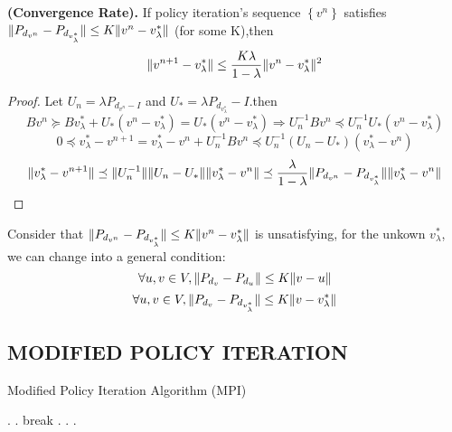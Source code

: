 \begin{theorem}
    \textbf{(Convergence Rate).}
    If policy iteration's sequence $ \left\{ v^n \right\} $ satisfies
    $ \Arrowvert P_{d_{v^n}} - P_{d_{v^*_{\lambda}}} \Arrowvert \le K \Arrowvert v^n - v^*_\lambda \Arrowvert $ (for some K),then
    \[
        \Arrowvert v^{n+1} - v^*_{\lambda} \Arrowvert \le \frac{K\lambda}{1-\lambda} \Arrowvert v^n - v^*_\lambda \Arrowvert^2
    \]
    \begin{proof}
        Let $ U_n = \lambda P_{d_{v^{n}}-I} $ and $ U_* = \lambda P_{d_{v^*_\lambda}} - I $.then
        \[
            Bv^n \succeq B v^*_\lambda + U_* (v^n - v^*_\lambda) = U_* (v^n - v^*_\lambda)
            \Rightarrow
            U^{-1}_{n} B v^n \preceq U^{-1}_n U_* (v^n - v^*_\lambda)
        \]
        \[
            0 \preceq v^*_\lambda - v^{n+1} = v^*_\lambda - v^n + U^{-1}_{n}B v^n
            \preceq U^{-1}_n (U_n - U_*)(v^*_\lambda - v^n)
        \]
        \[
            \Arrowvert v^*_{\lambda} - v^{n+1} \Arrowvert \preceq \Arrowvert U^{-1}_{n} \Arrowvert
            \Arrowvert U_n - U_* \Arrowvert \Arrowvert v^*_{\lambda} - v^n \Arrowvert \preceq \frac{\lambda}{1-\lambda} \Arrowvert P_{d_{v^n}} - P_{d_{v^*_{\lambda}}} \Arrowvert \Arrowvert v^*_\lambda - v^n \Arrowvert
        \]
    \end{proof}
\end{theorem}

Consider that $ \Arrowvert P_{d_{v^n}} - P_{d_{v^*_{\lambda}}} \Arrowvert \le K \Arrowvert v^n - v^*_\lambda \Arrowvert $ is unsatisfying, for the unkown $ v^*_\lambda $, we can change into a general condition:
\[
    \forall u, v \in V, \Arrowvert P_{d_{v}} - P_{d_{u}} \Arrowvert\le K \Arrowvert v - u \Arrowvert 
\]
\[
    \forall u, v \in V, \Arrowvert P_{d_{v}} - P_{d_{v^*_\lambda}} \Arrowvert\le K \Arrowvert v - v^*_\lambda \Arrowvert 
\]

\subsection{MODIFIED POLICY ITERATION}%
\label{sub:modified_policy_iteration}

\begin{algorithm}[h!]
    \caption{Modified Policy Iteration Algorithm (MPI)}
    \begin{algorithmic}
        .
        .
             {break} \EndIf.
            \EndFor.
        \EndFor.
    \end{algorithmic}
\end{algorithm}

